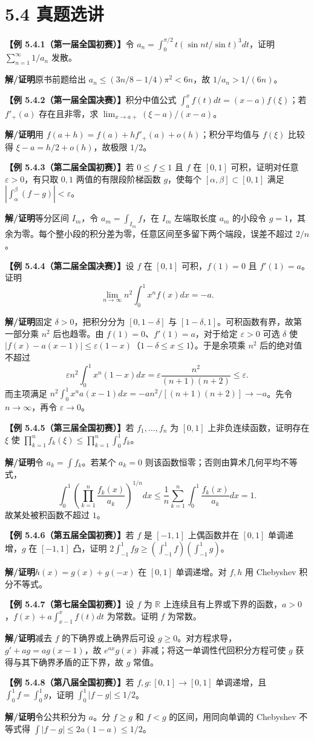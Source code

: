 \documentclass[UTF8,a4paper,11pt]{ctexart}
\newcommand{\ex}[1]{\par\medskip\noindent\textbf{【例 #1】}\;}
\newcommand{\sol}{\par\noindent\textbf{解/证明}\;}
\newcommand{\R}{\mathbb R}
\begin{document}
\section*{5.4 真题选讲}
\ex{5.4.1（第一届全国初赛）}令 $a_n=\int_0^{\pi/2}t(\sin nt/\sin t)^3dt$，证明 $\sum_{n=1}^\infty1/a_n$ 发散。
\sol 原书前题给出 $a_n\le(3n/8-1/4)\pi^2<6n$，故 $1/a_n>1/(6n)$。
\ex{5.4.2（第一届全国决赛）}积分中值公式 $\int_a^xf(t)dt=(x-a)f(\xi)$；若 $f'_+(a)$ 存在且非零，求 $\lim_{x\to a+}(\xi-a)/(x-a)$。
\sol 用 $f(a+h)=f(a)+hf'_+(a)+o(h)$；积分平均值与 $f(\xi)$ 比较得 $\xi-a=h/2+o(h)$，故极限 $1/2$。
\ex{5.4.3（第二届全国初赛）}若 $0\le f\le1$ 且 $f$ 在 $[0,1]$ 可积，证明对任意 $\varepsilon>0$，有只取 $0,1$ 两值的有限段阶梯函数 $g$，使每个 $[\alpha,\beta]\subset[0,1]$ 满足 $|\int_\alpha^\beta(f-g)|<\varepsilon$。
\sol 等分区间 $I_m$，令 $a_m=\int_{I_m}f$，在 $I_m$ 左端取长度 $a_m$ 的小段令 $g=1$，其余为零。每个整小段的积分差为零，任意区间至多留下两个端段，误差不超过 $2/n$。
\ex{5.4.4（第二届全国决赛）}设 $f$ 在 $[0,1]$ 可积，$f(1)=0$ 且 $f'(1)=a$。证明
\[\lim_{n\to\infty}n^2\int_0^1x^nf(x)dx=-a.\]
\sol 固定 $\delta>0$，把积分分为 $[0,1-\delta]$ 与 $[1-\delta,1]$。可积函数有界，故第一部分乘 $n^2$ 后也趋零。由 $f(1)=0$、$f'(1)=a$，对于给定 $\varepsilon>0$ 可选 $\delta$ 使 $|f(x)-a(x-1)|\le\varepsilon(1-x)$（$1-\delta\le x\le1$）。于是余项乘 $n^2$ 后的绝对值不超过
\[\varepsilon n^2\int_0^1x^n(1-x)dx
=\varepsilon\frac{n^2}{(n+1)(n+2)}\le\varepsilon.\]
而主项满足 $n^2\int_0^1x^n a(x-1)dx=-a n^2/[(n+1)(n+2)]\to-a$。先令 $n\to\infty$，再令 $\varepsilon\to0$。
\ex{5.4.5（第三届全国初赛）}若 $f_1,\dots,f_n$ 为 $[0,1]$ 上非负连续函数，证明存在 $\xi$ 使 $\prod_{k=1}^nf_k(\xi)\le\prod_{k=1}^n\int_0^1f_k$。
\sol 令 $a_k=\int f_k$。若某个 $a_k=0$ 则该函数恒零；否则由算术几何平均不等式，
\[\int_0^1\left(\prod_{k=1}^n\frac{f_k(x)}{a_k}\right)^{1/n}dx\le\frac1n\sum_{k=1}^n\int_0^1\frac{f_k(x)}{a_k}dx=1.\]
故某处被积函数不超过 $1$。
\ex{5.4.6（第五届全国初赛）}若 $f$ 是 $[-1,1]$ 上偶函数并在 $[0,1]$ 单调递增，$g$ 在 $[-1,1]$ 凸，证明 $2\int_{-1}^1fg\ge(\int_{-1}^1f)(\int_{-1}^1g)$。
\sol $h(x)=g(x)+g(-x)$ 在 $[0,1]$ 单调递增。对 $f,h$ 用 Chebyshev 积分不等式。
\ex{5.4.7（第七届全国初赛）}设 $f$ 为 $\R$ 上连续且有上界或下界的函数，$a>0$，$f(x)+a\int_{x-1}^xf(t)dt$ 为常数。证明 $f$ 为常数。
\sol 减去 $f$ 的下确界或上确界后可设 $g\ge0$。对方程求导，$g'+ag=ag(x-1)$，故 $e^{ax}g(x)$ 非减；将这一单调性代回积分方程可使 $g$ 获得与其下确界矛盾的正下界，故 $g$ 常值。
\ex{5.4.8（第八届全国初赛）}若 $f,g:[0,1]\to[0,1]$ 单调递增，且 $\int_0^1f=\int_0^1g$，证明 $\int_0^1|f-g|\le1/2$。
\sol 令公共积分为 $a$。分 $f\ge g$ 和 $f<g$ 的区间，用同向单调的 Chebyshev 不等式得 $\int|f-g|\le2a(1-a)\le1/2$。
\end{document}
